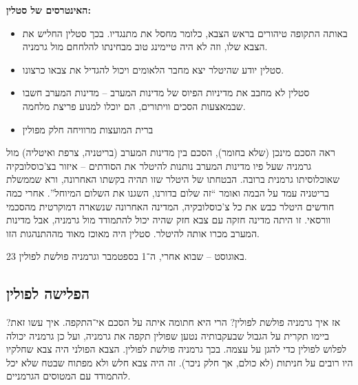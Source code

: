 \documentclass[]{article}
\begin{document}
   \textbf{האינטרסים של סטלין: }
   \begin{itemize}
       \item באותה התקופה טיהורים בראש הצבא, כלומר מחסל את מתנגדיו. בכך סטלין החליש את הצבא שלו, וזה לא היה טיימינג טוב מבחינתו להלחחם מול גרמניה.
       \item סטלין יודע שהיטלר יצא מחבר הלאומים ויכול להגדיל את צבאו כרצונו. 
       \item סטלין לא מחבב את מדיניות הפיוס של מדינות המערב – מדינות המערב חשבו שבמאצעות הסכים וויתורים, הם יוכלו למנוע פריצת מלחמה. 
       \item ברית המועצות מרוויחה חלק מפולין
   \end{itemize}
   
   ראה הסכם מינכן (שלא בחומר), הסכם בין מדינות המערב (בריטניה, צרפת ואיטליה) מול גרמניה שעל פיו מדינות המערב נותנות להיטלר את הסודתים – איזור בצ'כוסלובקיה שאוכלוסיתו גרמנית ברובה. הבטחתו של היטלר שזו תהיה בקשתו האחרונה, ורא שממשלת בריטניה עמד על הבמה ואומר ``זה שלום בדורנו, השגנו את השלום המיוחל''. אחרי כמה חודשים היטלר כבש את כל צ'כוסלובקיה, המדינה האחרונה שנשארה דמוקרטית מהסכמי וורסאי. זו היתה מדינה חזקה עם צבא חזק שהיה יכול להתמודד מול גרמניה, אבל מדינות המערב מכרו אותה להיטלר. סטלין היה מאוכז מאוד מההתנהגות הזו. 
   
   23 באוגוסט – שבוא אחרי, ה־1 בספטמבר וגרמניה פולשת לפולין. 
   
   \subsection{הפלישה לפולין}
   אז איך גרמניה פולשת לפולין? הרי היא חתומה איתה על הסכם אי־התקפה. איך עשו זאת? ביימו תקרית על הגבול שבעקבותיה נטען שפולין תקפה את גרמניה, ועל כן גרמניה יכולה לפלוש לפולין כדי להגן על עצמה. בכך גרמניה פולשת לפולין. הצבא הפולני היה צבא שחלקיו היו רובים על חניתות (לא כולם, אך חלק ניכר). זה היה צבא חלש ולא מפתוח שבטח שלא יכל להתמודד עם המטוסים הגרמניים. 
   
\end{document}
